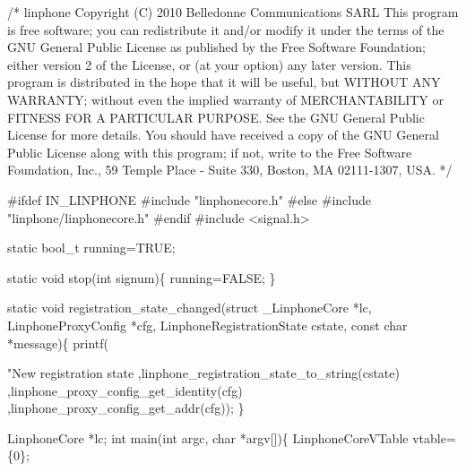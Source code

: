\begin{DoxyCodeInclude}

\textcolor{comment}{/*}
\textcolor{comment}{linphone}
\textcolor{comment}{Copyright (C) 2010  Belledonne Communications SARL }
\textcolor{comment}{}
\textcolor{comment}{This program is free software; you can redistribute it and/or}
\textcolor{comment}{modify it under the terms of the GNU General Public License}
\textcolor{comment}{as published by the Free Software Foundation; either version 2}
\textcolor{comment}{of the License, or (at your option) any later version.}
\textcolor{comment}{}
\textcolor{comment}{This program is distributed in the hope that it will be useful,}
\textcolor{comment}{but WITHOUT ANY WARRANTY; without even the implied warranty of}
\textcolor{comment}{MERCHANTABILITY or FITNESS FOR A PARTICULAR PURPOSE.  See the}
\textcolor{comment}{GNU General Public License for more details.}
\textcolor{comment}{}
\textcolor{comment}{You should have received a copy of the GNU General Public License}
\textcolor{comment}{along with this program; if not, write to the Free Software}
\textcolor{comment}{Foundation, Inc., 59 Temple Place - Suite 330, Boston, MA  02111-1307, USA.}
\textcolor{comment}{*/}

\textcolor{preprocessor}{#ifdef IN\_LINPHONE}
\textcolor{preprocessor}{}\textcolor{preprocessor}{#include "linphonecore.h"}
\textcolor{preprocessor}{#else}
\textcolor{preprocessor}{}\textcolor{preprocessor}{#include "linphone/linphonecore.h"}
\textcolor{preprocessor}{#endif}
\textcolor{preprocessor}{}
\textcolor{preprocessor}{#include <signal.h>}

\textcolor{keyword}{static} bool\_t running=TRUE;

\textcolor{keyword}{static} \textcolor{keywordtype}{void} stop(\textcolor{keywordtype}{int} signum)\{
        running=FALSE;
\}

\textcolor{keyword}{static} \textcolor{keywordtype}{void} registration\_state\_changed(\textcolor{keyword}{struct} \_LinphoneCore *lc, 
      LinphoneProxyConfig *cfg, LinphoneRegistrationState cstate, \textcolor{keyword}{const} \textcolor{keywordtype}{char} *message)\{
                printf(\textcolor{stringliteral}{"New registration state %
                                ,linphone_registration_state_to_string(cstate)
                                ,linphone_proxy_config_get_identity(cfg)
                                ,linphone_proxy_config_get_addr(cfg));
\}

LinphoneCore *lc;
\textcolor{keywordtype}{int} main(\textcolor{keywordtype}{int} argc, \textcolor{keywordtype}{char} *argv[])\{
        LinphoneCoreVTable vtable=\{0\};

}
\end{DoxyCodeInclude}
